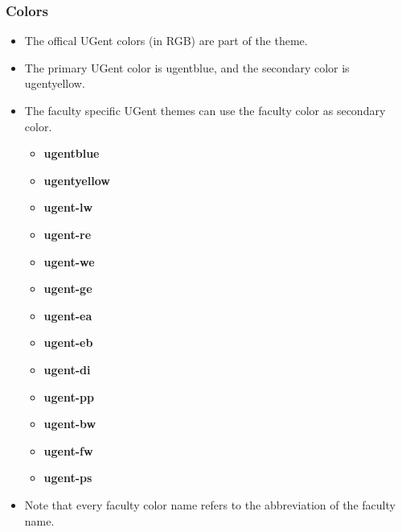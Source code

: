 \documentclass[aspectratio=169]{beamer}
\begin{document}
\begin{frame}
    \frametitle{Colors}
    \begin{itemize}
        \item The offical UGent colors (in RGB)  are part of the theme.
        \item The primary UGent color is {\color{ugentblue} ugentblue}, and the secondary color is {\color{ugentyellow} ugentyellow}.
        \item The faculty specific UGent themes can use the faculty color as secondary color.
            \begin{center}
                \begin{minipage}[t]{.35\textwidth}
                    \begin{itemize}
                        \item {\color{ugentblue}  \textbf{ugentblue}}
                        \item {\color{ugentyellow}\textbf{ugentyellow}}
                        \item {\color{ugent-lw}   \textbf{ugent-lw}}
                        \item {\color{ugent-re}   \textbf{ugent-re}}
                        \item {\color{ugent-we}   \textbf{ugent-we}}
                        \item {\color{ugent-ge}   \textbf{ugent-ge}}
                        \item {\color{ugent-ea}   \textbf{ugent-ea}}
                    \end{itemize}
                \end{minipage}%
                \begin{minipage}[t]{.35\textwidth}
                    \begin{itemize}
                        \item {\color{ugent-eb} \textbf{ugent-eb}}
                        \item {\color{ugent-di} \textbf{ugent-di}}
                        \item {\color{ugent-pp} \textbf{ugent-pp}}
                        \item {\color{ugent-bw} \textbf{ugent-bw}}
                        \item {\color{ugent-fw} \textbf{ugent-fw}}
                        \item {\color{ugent-ps} \textbf{ugent-ps}}
                    \end{itemize}
                \end{minipage}
                \vspace{.5cm}
            \end{center}
        \item Note that every faculty color name refers to the abbreviation of the faculty name.
    \end{itemize}
\end{frame}
\end{document}
